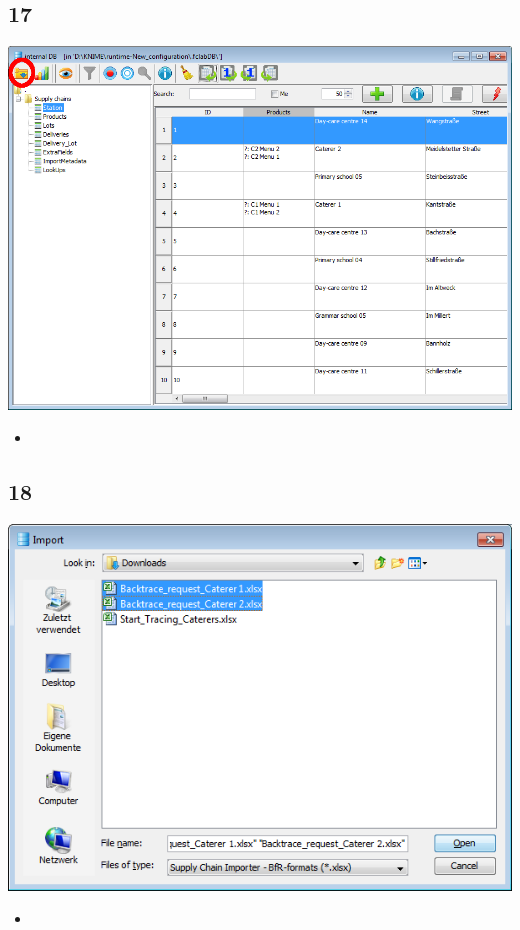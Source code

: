 \documentclass{beamer}
\begin{document}
\subsection{17}
\begin{frame}
	\begin{center}
  		\includegraphics[height=0.6\textheight]{17.png}
	\end{center}
	\begin{itemize}
		\item
	\end{itemize}
\end{frame}

\subsection{18}
\begin{frame}
	\begin{center}
  		\includegraphics[height=0.5\textheight]{18.png}
	\end{center}
	\begin{itemize}
		\item
	\end{itemize}
\end{frame}
\end{document}
